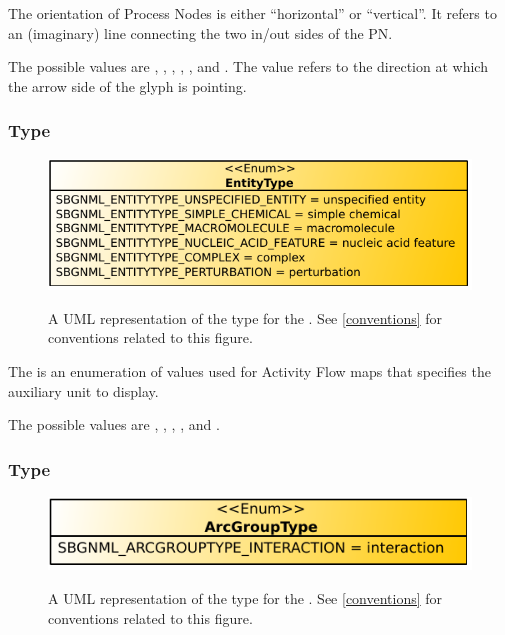 The orientation of Process Nodes is either ``horizontal'' or ``vertical''. It refers to an (imaginary) line connecting the two in/out sides of the PN.

The possible values are , ,
, , , and .
The value refers to the direction at which the arrow side of the glyph is pointing.



\subsubsection{Type \fixttspace{}}

\begin{figure}[ht!]
  \centering
  \includegraphics[scale=0.7]{figures/sbgnml_type_enum_entitytype_uml.pdf}\\
\caption{A UML representation of the \EntityType type for the
\SbgnmlPackage. See \ref{conventions} for conventions related to this
figure. }
  \label{fig:sbgnml_type_enum_entitytype_uml}
\end{figure}


The  is an enumeration of values used for Activity Flow maps 
that specifies the auxiliary unit to display. 

The possible values are , , , , and
.

\subsubsection{Type \fixttspace{}}

\begin{figure}[ht!]
  \centering
  \includegraphics[scale=0.7]{figures/sbgnml_type_enum_arcgrouptype_uml.pdf}\\
\caption{A UML representation of the \ArcGroupType type for the
\SbgnmlPackage. See \ref{conventions} for conventions related to this
figure. }
  \label{fig:sbgnml_type_enum_arcgrouptype_uml}
\end{figure}


